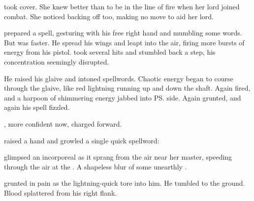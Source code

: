 \Criseis{} took cover. 
She knew better than to be in the line of fire when her lord joined combat. 
She noticed \Achsah{} backing off too, making no move to aid her lord. 

\Ishnaruchaefir{} prepared a spell, gesturing with his free right hand and mumbling some words. 
But \Teshrial{} was faster. 
He spread his wings and leapt into the air, firing more bursts of energy from his pistol. 
\Ishnaruchaefir{} took several hits and stumbled back a step, his concentration seemingly disrupted. 

He raised his glaive and intoned spellwords. 
Chaotic energy began to course through the glaive, like red lightning running up and down the shaft. 
Again \Teshrial{} fired, and a harpoon of shimmering energy jabbed into \ps{\Ishnaruchaefir}{} side. 
Again \Ishnaruchaefir{} grunted, and again his spell fizzled. 

\Teshrial, more confident now, charged forward. 

\Ishnaruchaefir{} raised a hand and growled a single quick spellword:
\ta{\kingstongue{\Guthnyad!}}

\Criseis{} glimpsed an incorporeal \daemon{} as it sprang from the air near her master, speeding through the air at the \resphan. 
A shapeless blur of some unearthly \colour. 

\Teshrial{} grunted in pain as the lightning-quick \daemon{} tore into him. 
He tumbled to the ground. 
Blood splattered from his right flank. 


